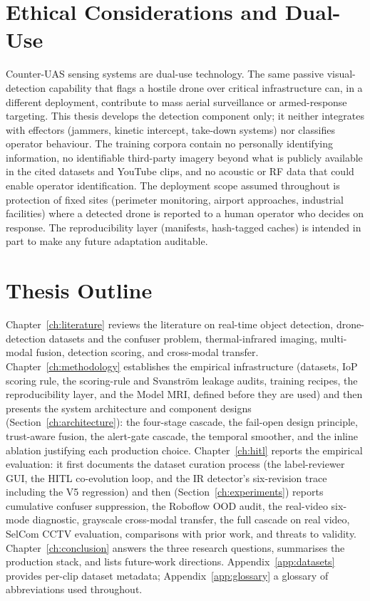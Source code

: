 \section{Ethical Considerations and Dual-Use}
\label{sec:ethics}

Counter-UAS sensing systems are dual-use technology. The same passive visual-detection capability that flags a hostile drone over critical infrastructure can, in a different deployment, contribute to mass aerial surveillance or armed-response targeting. This thesis develops the detection component only; it neither integrates with effectors (jammers, kinetic intercept, take-down systems) nor classifies operator behaviour. The training corpora contain no personally identifying information, no identifiable third-party imagery beyond what is publicly available in the cited datasets and YouTube clips, and no acoustic or RF data that could enable operator identification. The deployment scope assumed throughout is protection of fixed sites (perimeter monitoring, airport approaches, industrial facilities) where a detected drone is reported to a human operator who decides on response. The reproducibility layer (manifests, hash-tagged caches) is intended in part to make any future adaptation auditable.

\section{Thesis Outline}
\label{sec:outline}

Chapter~\ref{ch:literature} reviews the literature on real-time object detection, drone-detection datasets and the confuser problem, thermal-infrared imaging, multi-modal fusion, detection scoring, and cross-modal transfer. Chapter~\ref{ch:methodology} establishes the empirical infrastructure (datasets, IoP scoring rule, the scoring-rule and Svanstr\"om leakage audits, training recipes, the reproducibility layer, and the Model MRI, defined before they are used) and then presents the system architecture and component designs (Section~\ref{ch:architecture}): the four-stage cascade, the fail-open design principle, trust-aware fusion, the alert-gate cascade, the temporal smoother, and the inline ablation justifying each production choice. Chapter~\ref{ch:hitl} reports the empirical evaluation: it first documents the dataset curation process (the label-reviewer GUI, the HITL co-evolution loop, and the IR detector's six-revision trace including the V5 regression) and then (Section~\ref{ch:experiments}) reports cumulative confuser suppression, the Roboflow OOD audit, the real-video six-mode diagnostic, grayscale cross-modal transfer, the full cascade on real video, SelCom CCTV evaluation, comparisons with prior work, and threats to validity. Chapter~\ref{ch:conclusion} answers the three research questions, summarises the production stack, and lists future-work directions. Appendix~\ref{app:datasets} provides per-clip dataset metadata; Appendix~\ref{app:glossary} a glossary of abbreviations used throughout.

